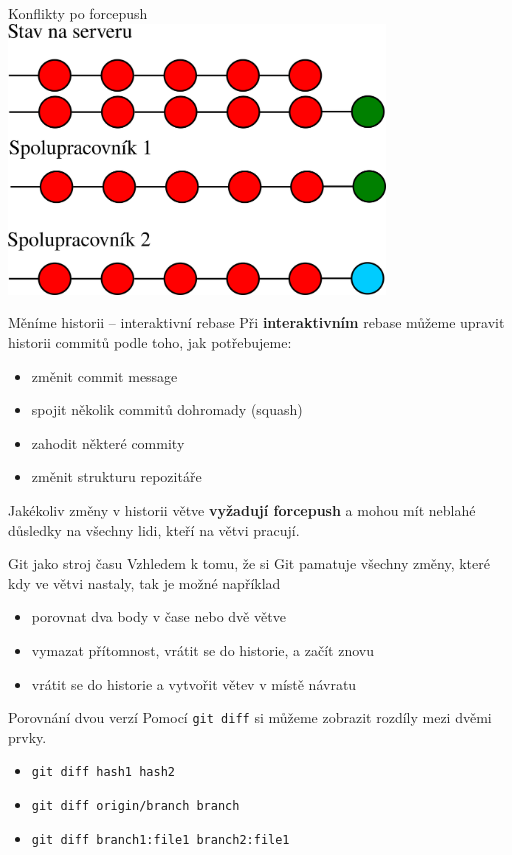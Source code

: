 \documentclass[14pt]{beamer}
\renewcommand{\texttt}[1]{{{\tt\color{blue}#1}}}
\begin{document}
	\begin{frame}{Konflikty po forcepush}
	\includegraphics[width=10cm]{images/forcepush}
	\end{frame}


	\begin{frame}{Měníme historii -- interaktivní rebase}
		Při \textbf{interaktivním} rebase můžeme upravit historii commitů podle toho, jak potřebujeme:
	\begin{itemize}
		\item změnit commit message
		\item spojit několik commitů dohromady (squash)
		\item zahodit některé commity
		\item změnit strukturu repozitáře
	\end{itemize}
	Jakékoliv změny v historii větve \textbf{vyžadují forcepush} a mohou mít neblahé důsledky na všechny lidi, kteří na větvi pracují.
	\end{frame}

	\begin{frame}{Git jako stroj času}
		Vzhledem k tomu, že si Git pamatuje všechny změny, které kdy ve větvi nastaly, tak je možné například 
		\begin{itemize}
			\item porovnat dva body v čase nebo dvě větve
			\item vymazat přítomnost, vrátit se do historie, a začít znovu
			\item vrátit se do historie a vytvořit větev v místě návratu
		\end{itemize}
	\end{frame}

	\begin{frame}{Porovnání dvou verzí}
		Pomocí \texttt{git diff} si můžeme zobrazit rozdíly mezi dvěmi prvky.
		\begin{itemize}
		\item \texttt{git diff hash1 hash2}
		\item \texttt{git diff origin/branch branch}
		\item \texttt{git diff branch1:file1 branch2:file1}
	\end{itemize}
\end{frame}
\end{document}

